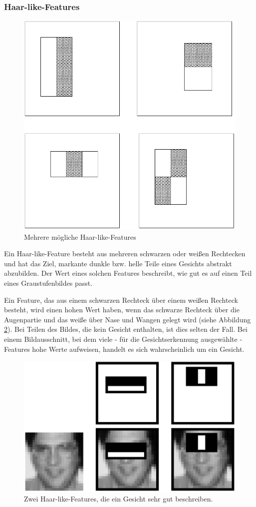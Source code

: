\documentclass[doktyp=semarbeit, sprache=german]{TUBAFarbeiten}
\begin{document}
\subsubsection{Haar-like-Features}
\begin{figure}
	\centering
	\includegraphics[width=0.4\linewidth]{images/haarfeatures}
	\caption[Haar-like-Features]{Mehrere mögliche Haar-like-Features}
	\label{fig:haarfeatures}
\end{figure}


Ein Haar-like-Feature besteht aus mehreren schwarzen oder weißen Rechtecken und hat das Ziel, markante dunkle bzw. helle Teile eines Gesichts abstrakt abzubilden. Der Wert eines solchen Features beschreibt, wie gut es auf einen Teil eines Graustufenbildes passt.

Ein Feature, das aus einem schwarzen Rechteck über einem weißen Rechteck besteht, wird einen hohen Wert haben, wenn das schwarze Rechteck über die Augenpartie und das weiße über Nase und Wangen gelegt wird (siehe Abbildung \ref{fig:haarfeatures2}). Bei Teilen des Bildes, die kein Gesicht enthalten, ist dies selten der Fall. Bei einem Bildausschnitt, bei dem viele - für die Gesichtserkennung ausgewählte - Features hohe Werte aufweisen, handelt es sich wahrscheinlich um ein Gesicht.

\begin{figure}
	\centering
	\includegraphics[width=0.7\linewidth]{images/haarfeatures2}
	\caption[Haar-like-Features - Beispiel]{Zwei Haar-like-Features, die ein Gesicht sehr gut beschreiben.}
	\label{fig:haarfeatures2}
\end{figure}
\end{document}
